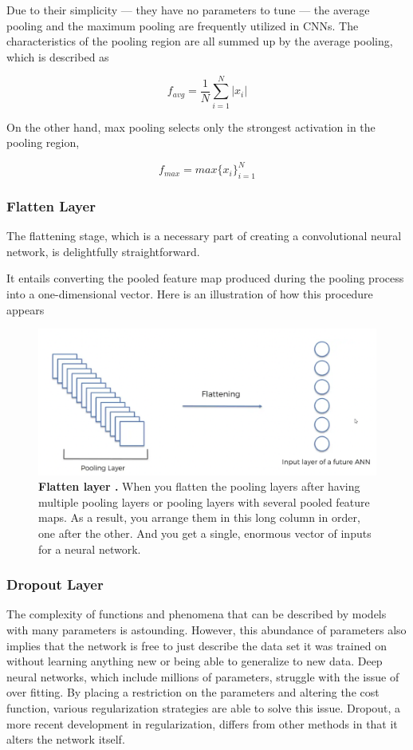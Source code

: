\documentclass[conference]{IEEEtran}
\begin{document}
Due to their simplicity — they have no parameters to tune — the average pooling and the maximum pooling are frequently utilized in CNNs. The characteristics of the pooling region are all summed up by the average pooling, which is described as

\[ f_{avg} = \frac{1}{N}\sum_{i=1}^{N}|x_i|\]

On the other hand, max pooling selects only the strongest activation in the pooling region,

\[ f_{max} = max\{x_i\}_{i=1}^N\]

\subsubsection{Flatten Layer}

The flattening stage, which is a necessary part of creating a convolutional neural network, is delightfully straightforward.

It entails converting the pooled feature map produced during the pooling process into a one-dimensional vector. Here is an illustration of how this procedure appears

\begin{figure}[h!]
\centering
\includegraphics[width=1\linewidth]{images/flatten.jpg}
\caption{\textbf{Flatten layer \cite{b3}.} When you flatten the pooling layers after having multiple pooling layers or pooling layers with several pooled feature maps. As a result, you arrange them in this long column in order, one after the other. And you get a single, enormous vector of inputs for a neural network.}
\label{fig:flatten}
\end{figure}

\subsubsection{Dropout Layer}

The complexity of functions and phenomena that can be described by models with many parameters is astounding. However, this abundance of parameters also implies that the network is free to just describe the data set it was trained on without learning anything new or being able to generalize to new data. Deep neural networks, which include millions of parameters, struggle with the issue of over fitting. By placing a restriction on the parameters and altering the cost function, various regularization strategies are able to solve this issue. Dropout, a more recent development in regularization, differs from other methods in that it alters the network itself.
\end{document}
